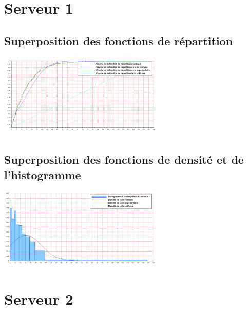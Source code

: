 \documentclass{article}
\begin{document}
\paragraph{}

\section{Serveur 1}

\subsection{Superposition des fonctions de répartition}
\begin{center}
\includegraphics[width=300px]{img/S1_repartitions.png}
\end{center}
\paragraph{}

\subsection{Superposition des fonctions de densité et de l'histogramme}
\begin{center}
\includegraphics[width=300px]{img/S1_densite.png}
\end{center}
\paragraph{}

\section{Serveur 2}
\end{document}

